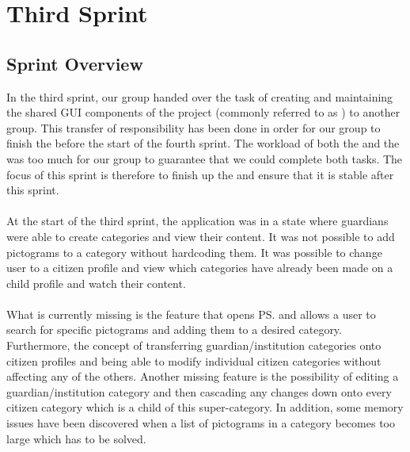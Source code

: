 \part{Third Sprint}
\label{par:third_sprint}

\chapter{Sprint Overview}
In the third sprint, our group handed over the task of creating and maintaining the shared GUI components of the project (commonly referred to as \gc) to another group. This transfer of responsibility has been done in order for our group to finish the \ct before the start of the fourth sprint. The workload of both the \ct and the \gc was too much for our group to guarantee that we could complete both tasks. The focus of this sprint is therefore to finish up the \ct and ensure that it is stable after this sprint.
\\\\
At the start of the third sprint, the application was in a state where guardians were able to create categories and view their content. It was not possible to add pictograms to a category without hardcoding them. It was possible to change user to a citizen profile and view which categories have already been made on a child profile and watch their content. 
\\\\
What is currently missing is the feature that opens \ps and allows a user to search for specific pictograms and adding them to a desired category. Furthermore, the concept of transferring guardian/institution categories onto citizen profiles and being able to modify individual citizen categories without affecting any of the others. Another missing feature is the possibility of editing a guardian/institution category and then cascading any changes down onto every citizen category which is a child of this super-category. In addition, some memory issues have been discovered when a list of pictograms in a category becomes too large which has to be solved. 





